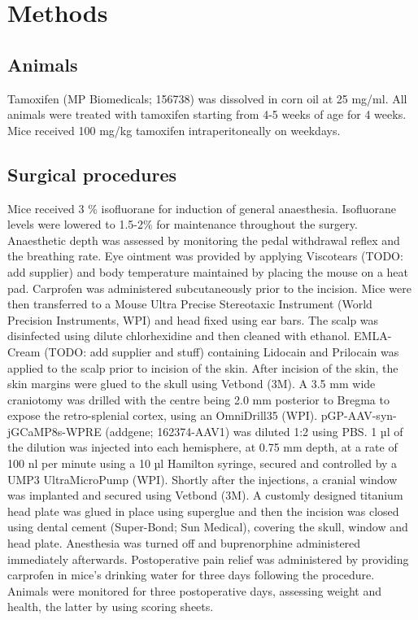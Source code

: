 \chapter{Methods}
\label{ch:4-methods}

\minitoc

\section{Animals}
Tamoxifen (MP Biomedicals; 156738) was dissolved in corn oil at 25 mg/ml. All animals were treated with tamoxifen starting from 4-5 weeks of age for 4 weeks. Mice received 100 mg/kg tamoxifen intraperitoneally on weekdays.
\section{Surgical procedures}
Mice received 3 \% isofluorane for induction of general anaesthesia. Isofluorane levels were lowered to 1.5-2\% for maintenance throughout the surgery. Anaesthetic depth was assessed by monitoring the pedal withdrawal reflex and the breathing rate. Eye ointment was provided by applying Viscotears (TODO: add supplier) and body temperature maintained by placing the mouse on a heat pad. Carprofen was administered subcutaneously prior to the incision. Mice were then transferred to a Mouse Ultra Precise Stereotaxic Instrument (World Precision Instruments, WPI) and head fixed using ear bars. The scalp was disinfected using dilute chlorhexidine and then cleaned with ethanol.  EMLA-Cream (TODO: add supplier and stuff) containing Lidocain and Prilocain was applied to the scalp prior to incision of the skin. After incision of the skin, the skin margins were glued to the skull using Vetbond (3M).
A 3.5 mm wide craniotomy was drilled  with the centre being 2.0 mm posterior to Bregma to expose the retro-splenial cortex, using an OmniDrill35 (WPI).
pGP-AAV-syn-jGCaMP8s-WPRE (addgene; 162374-AAV1) was diluted 1:2 using PBS. 1 µl of the dilution was injected into each hemisphere, at 0.75 mm depth, at a rate of 100 nl per minute using a 10 µl Hamilton syringe, secured and controlled by a UMP3 UltraMicroPump (WPI).
Shortly after the injections, a cranial window was implanted and secured using Vetbond (3M). A customly designed titanium head plate was glued in place using superglue and then the incision was closed using dental cement (Super-Bond; Sun Medical), covering the skull, window and head plate.
Anesthesia was turned off and buprenorphine administered immediately afterwards. Postoperative pain relief was administered by providing carprofen in mice's drinking water for three days following the procedure. Animals were monitored for three postoperative days, assessing weight and health, the latter by using scoring sheets.
